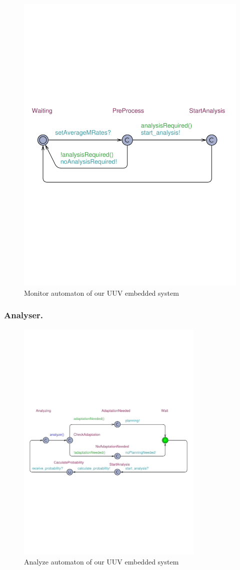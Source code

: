 \begin{figure}[h!]
	\centering
	\includegraphics[trim = 10mm 100mm 0mm 125mm, clip, width=0.5\linewidth]{figures/Monitor.pdf}
	\caption{Monitor automaton of our UUV embedded system}\label{fig:monitor-automaton}
	
	\vspace*{-2mm}
\end{figure}

\subsubsection{Analyser.}

\begin{figure}[b]
	\centering
	\includegraphics[trim = 5mm 95mm 0mm 105mm, clip, width=0.8\textwidth]{figures/Analyzer}
	\caption{Analyze automaton of our UUV embedded system}\label{fig:analysis-automaton}
	
	\vspace*{-2mm}
\end{figure}

